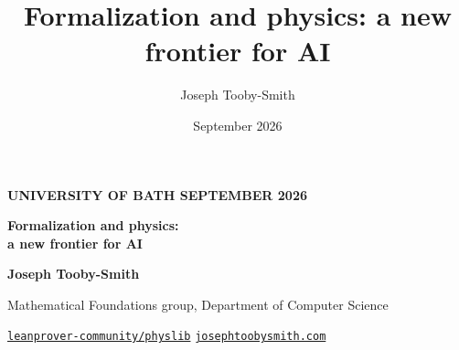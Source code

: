 \documentclass[aspectratio=169,10pt]{beamer}
\title{Formalization and physics: a new frontier for AI}
\author{Joseph Tooby-Smith}
\date{September 2026}
\newcommand{\plbody}{\small}
\newcommand{\plmeta}{\footnotesize}
\newcommand{\pllabel}{\footnotesize\bfseries}
\begin{document}
{
\begin{frame}[plain]
  \vfill
  \begin{center}
    {\color{plsky!35!white}\pllabel UNIVERSITY OF BATH \;\textbullet\; SEPTEMBER 2026}

    \vspace{0.55cm}

    {\color{white}\fontsize{27}{31}\selectfont\bfseries
      Formalization and physics:\\[1pt]
      a new frontier for AI\par}

    \vspace{0.45cm}


    \vspace{0.45cm}

    {\color{white}\Large\bfseries Joseph Tooby-Smith\par}
    \vspace{3pt}
    {\color{plsky!25!white}\plbody Mathematical Foundations group,
      Department of Computer Science\par}

    \vspace{0.55cm}

    {\color{white!85}\plmeta
      \href{https://github.com/leanprover-community/physlib}{%
        \color{white!85}\; \texttt{leanprover-community/physlib}}
      \qquad
      \href{https://josephtoobysmith.com/}{%
        \color{white!85}\; \texttt{josephtoobysmith.com}}\par}
  \end{center}
  \vfill
\end{frame}
}
\end{document}
